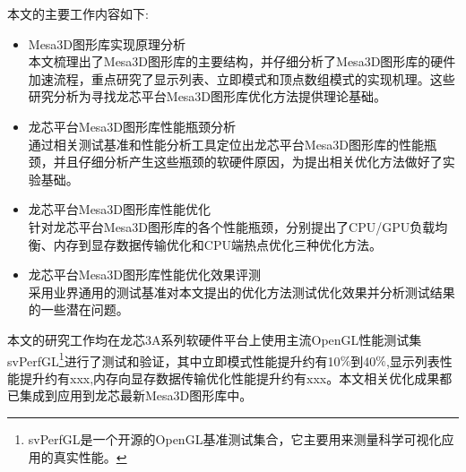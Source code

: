 
本文的主要工作内容如下:

\begin{itemize}
\item{Mesa3D图形库实现原理分析} \\
本文梳理出了Mesa3D图形库的主要结构，并仔细分析了Mesa3D图形库的硬件加速流程，重点研究了显示列表、立即模式和顶点数组模式的实现机理。这些研究分析为寻找龙芯平台Mesa3D图形库优化方法提供理论基础。
\item{龙芯平台Mesa3D图形库性能瓶颈分析} \\
通过相关测试基准和性能分析工具定位出龙芯平台Mesa3D图形库的性能瓶颈，并且仔细分析产生这些瓶颈的软硬件原因，为提出相关优化方法做好了实验基础。
\item{龙芯平台Mesa3D图形库性能优化} \\
针对龙芯平台Mesa3D图形库的各个性能瓶颈，分别提出了CPU/GPU负载均衡、内存到显存数据传输优化和CPU端热点优化三种优化方法。
\item{龙芯平台Mesa3D图形库性能优化效果评测} \\
采用业界通用的测试基准对本文提出的优化方法测试优化效果并分析测试结果的一些潜在问题。
\end{itemize}



本文的研究工作均在龙芯3A系列软硬件平台上使用主流OpenGL性能测试集svPerfGL\footnote{svPerfGL是一个开源的OpenGL基准测试集合，它主要用来测量科学可视化应用的真实性能。}进行了测试和验证，其中立即模式性能提升约有10$\%$到40$\%$,显示列表性能提升约有xxx,内存向显存数据传输优化性能提升约有xxx。本文相关优化成果都已集成到应用到龙芯最新Mesa3D图形库中。
